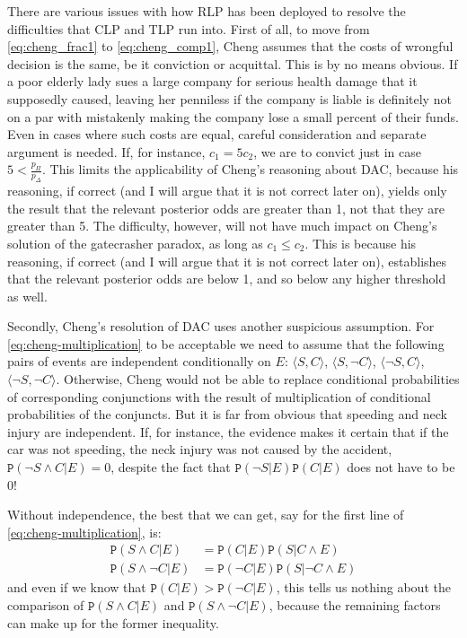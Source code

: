 \documentclass{ifcolog}
\newcommand{\pr}[1]{\mbox{$\mathtt{P}(#1)$}}
\newcommand{\n}{\neg}
\newcommand{\et}{\wedge}
\newcommand{\la}{\langle}
\newcommand{\ra}{\rangle}
\begin{document}
There are various issues with how RLP has been deployed to resolve the difficulties that CLP and TLP run into.  
First of all, to move from \eqref{eq:cheng_frac1} to \eqref{eq:cheng_comp1}, Cheng assumes that the costs of wrongful decision is the same, be it conviction or acquittal. This is by no means obvious. If a poor elderly lady sues a large company for serious health damage that it supposedly caused, leaving her penniless if the company is liable is definitely not on a par with mistakenly making the company lose a small percent of their funds. Even in cases where such costs are equal, careful consideration and separate argument is needed. If, for instance, $c_1=5c_2$, we are to convict just in case $5<\frac{p_\Pi}{p_\Delta}$. This limits the applicability of Cheng's reasoning about DAC, because his reasoning, if correct (and I will argue that it is not correct later on), yields only the result that the relevant posterior odds   are greater than 1, not that they are greater than 5. The difficulty, however,  will not have much impact on Cheng's solution of the gatecrasher paradox, as long as $c_1\leq c_2$. This is because his reasoning, if correct (and I will argue that it is not correct later on), establishes that the relevant posterior odds are below 1, and so below any higher threshold as well. 

Secondly, Cheng's resolution of DAC uses another suspicious assumption. For \eqref{eq:cheng-multiplication} to be acceptable we need  to assume that the following pairs of events are independent conditionally on $E$: $\la S, C\ra$, $\la S, \n C\ra$, $\la \n S, C\ra$, $\la \n S, \n C\ra$. Otherwise, Cheng would not  be able to replace conditional probabilities of corresponding conjunctions with the result of multiplication of conditional probabilities of the conjuncts. But it is far from obvious that speeding and neck injury are independent. If, for instance, the evidence makes it certain that if the car was not speeding, the neck injury was not  caused by the accident, $\pr{\n S\et C\vert E}=0$, despite the fact that $\pr{\n S \vert E}\pr{C\vert E}$ does not have to be $0$!


Without independence, the best that we can get, say for the first line of \eqref{eq:cheng-multiplication}, is:
\begin{align*}
\pr{S\et C\vert E} & = \pr{C\vert E}\pr{S\vert C \et E}\\
\pr{S\et \n C\vert E} & = \pr{\n C\vert E}\pr{S\vert  \n C \et E}
\end{align*}
and even if we know that $\pr{C\vert E}>\pr{\n C\vert E}$, this tells us nothing about the comparison of $\pr{S\et C\vert E}$ and $\pr{S\et \n C\vert E}$, because the remaining factors can make up for the former inequality. 
\end{document}
